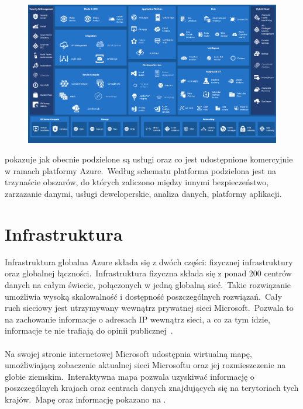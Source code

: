 \begin{figure}[H]
    \includegraphics[width=\textwidth]{images/ms_azure}
    \label{fig:ms-azure}
\end{figure}

 pokazuje jak obecnie podzielone są usługi oraz co jest udostępnione komercyjnie w ramach platformy Azure.\ Według schematu platforma podzielona jest na trzynaście obszarów, do których zaliczono między innymi bezpieczeństwo, zarzazanie danymi, usługi deweloperskie, analiza danych, platformy aplikacji.

\section{Infrastruktura}
Infrastruktura globalna Azure składa się z dwóch części: fizycznej infrastruktury oraz globalnej łączności.\ Infrastruktura fizyczna składa się z ponad 200 centrów danych na całym świecie, połączonych w jedną globalną sieć.\ Takie rozwiązanie umożliwia wysoką skalowalność i dostępność poszczególnych rozwiązań.\ Cały ruch sieciowy jest utrzymywany wewnątrz prywatnej sieci Microsoft.\ Pozwala to na zachowanie informacje o adresach IP wewnątrz sieci, a co za tym idzie, informacje te nie trafiają do opinii publicznej~\cite{MicrosoftAzureb}.\\ \\

Na swojej stronie internetowej Microsoft udostępnia wirtualną mapę, umożliwiającą zobaczenie aktualnej sieci Microsoftu oraz jej rozmieszczenie na globie ziemskim.\ Interaktywna mapa pozwala uzyskiwać informację o poszczególnych krajach oraz centrach danych znajdujących się na terytoriach tych krajów.\ Mapę oraz informację pokazano na .

